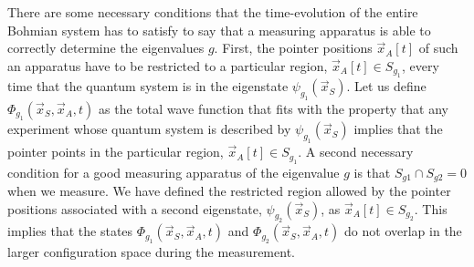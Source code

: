 \documentclass[nofootinbib, secnumarabic, amsmath, nobibnotes,11pt,aps,pra, floatfix]{revtex4-1}
\begin{document}
There are some necessary conditions that the time-evolution of the 
entire Bohmian system has to satisfy to say that a measuring
apparatus is able to correctly determine the eigenvalues $g$. First,
the pointer positions $\vec x_A[t]$ of such an apparatus have to be
restricted to a particular region, $\vec x_A[t]\in S_{g_1}$, every
time that the quantum system is in the eigenstate $\psi_{g_1}(\vec
x_S)$. Let us define $\Phi_{g_1}(\vec x_S,\vec x_A,t)$ as the total
wave function that fits with the property that any experiment whose
quantum system is described by $\psi_{g_1}(\vec x_S)$ implies that
the pointer points in the particular region, $\vec x_A[t]\in
S_{g_1}$. A second necessary condition for a good measuring
apparatus of the eigenvalue $g$ is that $S_{g1} \cap S_{g2} = 0$
when we measure. We have defined the restricted region
allowed by the pointer positions associated with a second
eigenstate, $\psi_{g_2}(\vec x_S)$, as $\vec x_A[t]\in S_{g_2}$.
This implies that the states $\Phi_{g_1}(\vec x_S,\vec x_A,t)$ and
$\Phi_{g_2}(\vec x_S,\vec x_A,t)$ do not overlap in the larger
configuration space during the measurement.
\end{document}
